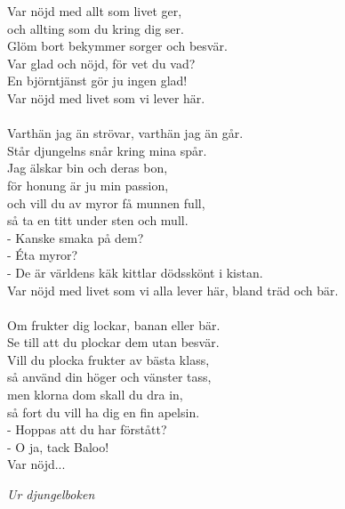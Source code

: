 \vspace{10pt}
Var nöjd med allt som livet ger,\\
och allting som du kring dig ser.\\
Glöm bort bekymmer sorger och besvär.\\
Var glad och nöjd, för vet du vad?\\
En björntjänst gör ju ingen glad!\\
Var nöjd med livet som vi lever här.\\
\\
Varthän jag än strövar, varthän jag än går.\\
Står djungelns snår kring mina spår.\\
Jag älskar bin och deras bon,\\
för honung är ju min passion,\\
och vill du av myror få munnen full,\\
så ta en titt under sten och mull.\\
- Kanske smaka på dem?\\
- Éta myror?\\
- De är världens käk kittlar dödsskönt i kistan.\\
Var nöjd med livet som vi alla lever här, bland träd och bär.\\
\\
Om frukter dig lockar, banan eller bär.\\
Se till att du plockar dem utan besvär.\\
Vill du plocka frukter av bästa klass,\\
så använd din höger och vänster tass,\\
men klorna dom skall du dra in,\\
så fort du vill ha dig en fin apelsin.\\
- Hoppas att du har förstått?\\
- O ja, tack Baloo!\\
Var nöjd...
\par
\vspace{10pt}
{\footnotesize\textit{Ur djungelboken}}
